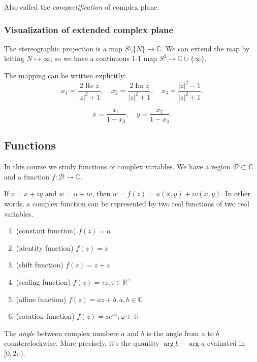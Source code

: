Also called the \textit{compactification} of complex plane.

\subsubsection{Visualization of extended complex plane}

The stereographic projection is a map $S \setminus \{N\} \to \mathbb{C}$. We can extend the map by letting $N \mapsto \infty $, so we have a continuous 1-1 map $S^2 \to \mathbb{C} \cup \{\infty \} $.

The mapping can be written explicitly: \[
x_1=\frac{2 \operatorname{Re} z}{|z|^2+1}, \quad x_2=\frac{2 \operatorname{Im} z}{|z|^2+1}, \quad x_3=\frac{|z|^2-1}{|z|^2+1} 
.\] 

\[
x=\frac{x_1}{1-x_3}, \quad y=\frac{x_2}{1-x_3}
.\] 


\subsection{Functions}

In this course we study functions of complex variables. We have a region $\mathcal{D} \subset \mathbb{C}$ and a function $f: \mathcal{D} \to  \mathbb{C}$.

If $z = x+iy$ and $w = u+iv $, then $w = f(z) = u(x,y) + iv(x,y)$. In other words, a complex function can be represented by two real functions of two real variables.

\begin{example}
	\quad
	\begin{enumerate}
		\item (constant function) $f(z) = a$
		\item (identity function) $f(z) = z$ 
		\item (shift function) $f(z) = z + a$
		\item (scaling function) $f(z) = \tau z, \tau \in \mathbb{R}^+$ 
		\item (affine function) $f(z) = a z + b, a,b \in \mathbb{C}$
		\item (rotation function) $f(z) = z e^{i \varphi}, \varphi \in \mathbb{R}$
	\end{enumerate}
\end{example}

\begin{definition}
	The \textit{angle} between complex numbers $a$ and  $b$ is the angle from  $a$ to $b$ counterclockwise. More precisely, it's the quantity $\operatorname{arg} b - \operatorname{arg} a$ evaluated in $[0,2 \pi)$.
\end{definition}

